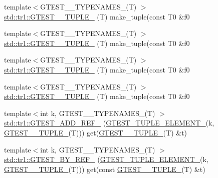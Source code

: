\begin{DoxyCompactItemize}
{\footnotesize template$<$G\+T\+E\+S\+T\+\_\+\_\+\+T\+Y\+P\+E\+N\+A\+M\+E\+S\+\_\+(\+T) $>$ }\\\hyperlink{namespacestd_1_1tr1_a61277f5af24b20fce87a9fd94307ab34}{std\+::tr1\+::\+G\+T\+E\+S\+T\+\_\+\_\+\+T\+U\+P\+L\+E\+\_\+} (T) make\+\_\+tuple(const T0 \&f0
\item 
{\footnotesize template$<$G\+T\+E\+S\+T\+\_\+\_\+\+T\+Y\+P\+E\+N\+A\+M\+E\+S\+\_\+(\+T) $>$ }\\\hyperlink{namespacestd_1_1tr1_a29c8efcb79a4749e079b704c418266e6}{std\+::tr1\+::\+G\+T\+E\+S\+T\+\_\+\_\+\+T\+U\+P\+L\+E\+\_\+} (T) make\+\_\+tuple(const T0 \&f0
\item 
{\footnotesize template$<$G\+T\+E\+S\+T\+\_\+\_\+\+T\+Y\+P\+E\+N\+A\+M\+E\+S\+\_\+(\+T) $>$ }\\\hyperlink{namespacestd_1_1tr1_a6afad1f98814ccc897d0b02bc6fc4e7d}{std\+::tr1\+::\+G\+T\+E\+S\+T\+\_\+\_\+\+T\+U\+P\+L\+E\+\_\+} (T) make\+\_\+tuple(const T0 \&f0
\item 
{\footnotesize template$<$G\+T\+E\+S\+T\+\_\+\_\+\+T\+Y\+P\+E\+N\+A\+M\+E\+S\+\_\+(\+T) $>$ }\\\hyperlink{namespacestd_1_1tr1_aa636d3269bf1f368a7bc09ff158bc482}{std\+::tr1\+::\+G\+T\+E\+S\+T\+\_\+\_\+\+T\+U\+P\+L\+E\+\_\+} (T) make\+\_\+tuple(const T0 \&f0
\item 
{\footnotesize template$<$int k, G\+T\+E\+S\+T\+\_\+\_\+\+T\+Y\+P\+E\+N\+A\+M\+E\+S\+\_\+(\+T) $>$ }\\\hyperlink{namespacestd_1_1tr1_a495d7fb7a131317a9ba985598d3c1504}{std\+::tr1\+::\+G\+T\+E\+S\+T\+\_\+\+A\+D\+D\+\_\+\+R\+E\+F\+\_\+} (\hyperlink{gtest-tuple_8h_a1b7f133d8aa02e0b7afed7b66781eeb7}{G\+T\+E\+S\+T\+\_\+\+T\+U\+P\+L\+E\+\_\+\+E\+L\+E\+M\+E\+N\+T\+\_\+}(k, \hyperlink{gtest-tuple_8h_a275e7bcd84299cc44b9c1dba971951c4}{G\+T\+E\+S\+T\+\_\+\_\+\+T\+U\+P\+L\+E\+\_\+}(T))) get(\hyperlink{gtest-tuple_8h_a275e7bcd84299cc44b9c1dba971951c4}{G\+T\+E\+S\+T\+\_\+\_\+\+T\+U\+P\+L\+E\+\_\+}(T) \&t)
\item 
{\footnotesize template$<$int k, G\+T\+E\+S\+T\+\_\+\_\+\+T\+Y\+P\+E\+N\+A\+M\+E\+S\+\_\+(\+T) $>$ }\\\hyperlink{namespacestd_1_1tr1_ae7b5ea477ac34a3eef5c4c15c42b76ed}{std\+::tr1\+::\+G\+T\+E\+S\+T\+\_\+\+B\+Y\+\_\+\+R\+E\+F\+\_\+} (\hyperlink{gtest-tuple_8h_a1b7f133d8aa02e0b7afed7b66781eeb7}{G\+T\+E\+S\+T\+\_\+\+T\+U\+P\+L\+E\+\_\+\+E\+L\+E\+M\+E\+N\+T\+\_\+}(k, \hyperlink{gtest-tuple_8h_a275e7bcd84299cc44b9c1dba971951c4}{G\+T\+E\+S\+T\+\_\+\_\+\+T\+U\+P\+L\+E\+\_\+}(T))) get(const \hyperlink{gtest-tuple_8h_a275e7bcd84299cc44b9c1dba971951c4}{G\+T\+E\+S\+T\+\_\+\_\+\+T\+U\+P\+L\+E\+\_\+}(T) \&t)

\end{DoxyCompactItemize}
